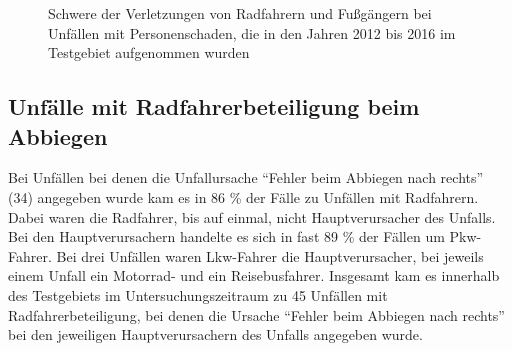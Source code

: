 \begin{savenotes}
	\begin{figure} [H]
		\caption[Schwere der Verletzungen von Radfahrern und Fußgängern bei Unfällen mit Personenschaden, die in den Jahren 2012 bis 2016 im Testgebiet aufgenommen wurden ]{Schwere der Verletzungen von Radfahrern und Fußgängern bei Unfällen mit Personenschaden, die in den Jahren 2012 bis 2016 im Testgebiet aufgenommen wurden}\label{fig:Verletzungsschwere_Rad_Fuss} 
	\end{figure}
\end{savenotes}

\subsection{Unfälle mit Radfahrerbeteiligung beim Abbiegen}\label{subsection:Abbiegeunfälle mit Radfahrern}
Bei Unfällen bei denen die Unfallursache \enquote{Fehler beim Abbiegen nach rechts} (34) angegeben wurde kam es in 86 \% der Fälle zu Unfällen mit Radfahrern. Dabei waren die Radfahrer, bis auf einmal, nicht Hauptverursacher des Unfalls. Bei den Hauptverursachern handelte es sich in fast 89 \% der Fällen um Pkw-Fahrer. Bei drei Unfällen waren Lkw-Fahrer die Hauptverursacher, bei jeweils einem Unfall ein Motorrad- und ein Reisebusfahrer. Insgesamt kam es innerhalb des Testgebiets im Untersuchungszeitraum zu 45 Unfällen mit Radfahrerbeteiligung, bei denen die Ursache \enquote{Fehler beim Abbiegen nach rechts} bei den jeweiligen Hauptverursachern des Unfalls angegeben wurde.

